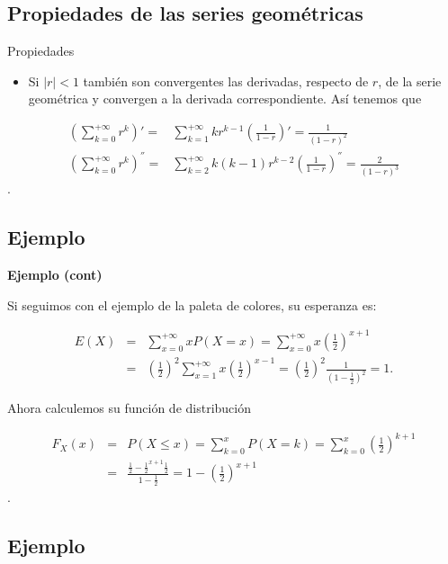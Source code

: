 \documentclass[]{book}
\providecommand{\tightlist}{%
  \setlength{\itemsep}{0pt}\setlength{\parskip}{0pt}}
\begin{document}
\hypertarget{propiedades-de-las-series-geomuxe9tricas-2}{%
\subsection{Propiedades de las series geométricas}\label{propiedades-de-las-series-geomuxe9tricas-2}}

Propiedades

\begin{itemize}
\tightlist
\item
  Si \(|r|<1\) también son convergentes las derivadas, respecto de \(r\), de la serie geométrica y convergen a la derivada correspondiente. Así tenemos que
\end{itemize}

\begin{eqnarray*}
\left(\sum_{k=0}^{+\infty} r^k\right)'= & \sum_{k=1}^{+\infty}k
r^{k-1} \left(\frac1{1-r}\right)'=\frac1{(1-r)^2}\\
\left(\sum_{k=0}^{+\infty} r^k\right)^{''}=& \sum_{k=2}^{+\infty}k (k-1)
r^{k-2}\left(\frac1{1-r}\right)^{''}=\frac2{(1-r)^3}
\end{eqnarray*}.

\hypertarget{ejemplo-16}{%
\subsection{Ejemplo}\label{ejemplo-16}}

\textbf{Ejemplo (cont)}

Si seguimos con el ejemplo de la paleta de colores, su esperanza es:

\begin{eqnarray*}
E(X)&=&\sum_{x=0}^{+\infty} x P(X=x)=\sum_{x=0}^{+\infty} x
\left(\frac12\right)^{x+1}\\
&= & \left(\frac12\right)^2\sum_{x=1}^{+\infty} x
\left(\frac12\right)^{x-1}=\left(\frac12\right)^2
\frac1{\left(1-\frac12\right)^2}=1.
\end{eqnarray*}

Ahora calculemos su función de distribución

\begin{eqnarray*}
F_X(x)&=& P(X\leq x)=\sum_{k=0}^x P(X=k)=\sum_{k=0}^x
\left(\frac12\right)^{k+1}\\
&=& \frac{\frac12-\frac12^{x+1}
\frac12}{1-\frac12}=1-\left(\frac12\right)^{x+1}
\end{eqnarray*}.

\hypertarget{ejemplo-17}{%
\subsection{Ejemplo}\label{ejemplo-17}}
\end{document}
